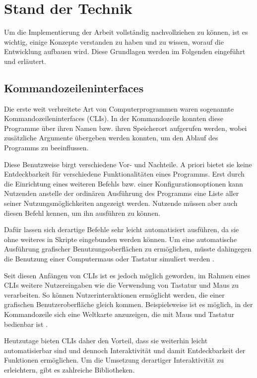 \section{Stand der Technik}
Um die Implementierung der Arbeit vollständig nachvollziehen zu können, ist es wichtig, einige Konzepte verstanden zu haben und zu wissen, worauf die Entwicklung aufbauen wird. Diese Grundlagen werden im Folgenden eingeführt und erläutert.

\subsection{Kommandozeileninterfaces}
Die erste weit verbreitete Art von Computerprogrammen waren sogenannte Kommandozeileninterfaces (\gls{CLI}s). In der Kommandozeile konnten diese Programme über ihren Namen bzw. ihren Speicherort aufgerufen werden, wobei zusätzliche Argumente übergeben werden konnten, um den Ablauf des Programms zu beeinflussen\cite{verma2013gracoli}.

Diese Benutzweise birgt verschiedene Vor- und Nachteile. A priori bietet sie keine Entdeckbarkeit für verschiedene Funktionalitäten eines Programms. Erst durch die Einrichtung eines weiteren Befehls bzw. einer Konfigurationsoptionen kann Nutzenden anstelle der ordinären Ausführung des Programms eine Liste aller seiner Nutzungsmöglichkeiten angezeigt werden. Nutzende müssen aber auch diesen Befehl kennen, um ihn ausführen zu können.

Dafür lassen sich derartige Befehle sehr leicht automatisiert ausführen, da sie ohne weiteres in Skripte eingebunden werden können. Um eine automatische Ausführung grafischer Benutzungsoberflächen zu ermöglichen, müsste dahingegen die Benutzung einer Computermaus oder Tastatur simuliert werden \cite{fellmann2007command}.

Seit diesen Anfängen von \gls{CLI}s ist es jedoch möglich geworden, im Rahmen eines \gls{CLI}s weitere Nutzereingaben wie die Verwendung von Tastatur und Maus zu verarbeiten. So können Nutzerinteraktionen ermöglicht werden, die einer grafischen Benutzeroberfläche gleich kommen. Beispielsweise ist es möglich, in der Kommandozeile sich eine Weltkarte anzuzeigen, die mit Maus und Tastatur bedienbar ist \cite{mapscii}.

Heutzutage bieten \gls{CLI}s daher den Vorteil, dass sie weiterhin leicht automatisierbar sind und dennoch Interaktivität und damit Entdeckbarkeit der Funktionen ermöglichen. Um die Umsetzung derartiger Interaktivität zu erleichtern, gibt es zahlreiche Bibliotheken.

